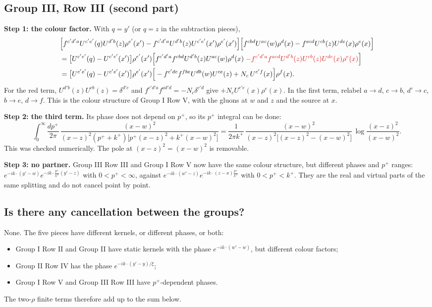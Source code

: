 \documentclass[9pt]{article}
\newcommand{\R}[1]{{\color{cR}#1}}
\numberwithin{equation}{section}
\begin{document}
\subsection{Group III, Row III (second part)}
\textbf{Step 1: the colour factor.} With $q=y'$ (or $q=z$ in the subtraction pieces),
\begin{align}
&\Big[f^{c'd'a}U^{c'e'}(q)U^{d'b}(z)\rho^{e'}(x')-f^{c'd'a}U^{d'b}(z)U^{c'e'}(x')\rho^{e'}(x')\Big]\Big[f^{cbd}U^{ac}(w)\rho^{d}(x)-f^{acd}U^{cb}(z)U^{de}(x)\rho^{e}(x)\Big]\notag\\
&=\big[U^{c'e'}(q)-U^{c'e'}(x')\big]\rho^{e'}(x')\Big[f^{c'd'a}f^{cbd}U^{d'b}(z)U^{ac}(w)\rho^{d}(x)\;\R{-f^{c'd'a}f^{acd}U^{d'b}(z)U^{cb}(z)U^{de}(x)\rho^{e}(x)}\Big]\notag\\
&=\big[U^{c'e'}(q)-U^{c'e'}(x')\big]\rho^{e'}(x')\Big[-f^{c'dc}f^{fbe}U^{db}(w)U^{ce}(z)+N_{c}\,U^{c'f}(x)\Big]\rho^{f}(x).
\end{align}
For the \R{red} term, $U^{d'b}(z)U^{cb}(z)=\delta^{d'c}$ and $f^{c'd'a}f^{ad'd}=-N_{c}\delta^{c'd}$ give $+N_{c}U^{c'e}(x)\rho^{e}(x)$. In the first term, relabel $a\to d$, $c\to b$, $d'\to c$, $b\to e$, $d\to f$. This is the colour structure of Group I Row V, with the gluons at $w$ and $z$ and the source at $x$.

\noindent\textbf{Step 2: the third term.} Its phase does not depend on $p^{+}$, so its $p^{+}$ integral can be done:
\begin{equation}
\int_{0}^{\infty}\frac{dp^{+}}{2\pi}\,\frac{(x-w)^{2}}{(x-z)^{2}(p^{+}+k^{+})\big[p^{+}(x-z)^{2}+k^{+}(x-w)^{2}\big]}=\frac{1}{2\pi k^{+}}\,\frac{(x-w)^{2}}{(x-z)^{2}\big[(x-z)^{2}-(x-w)^{2}\big]}\,\log\frac{(x-z)^{2}}{(x-w)^{2}}.
\end{equation}
This was checked numerically. The pole at $(x-z)^{2}=(x-w)^{2}$ is removable.

\noindent\textbf{Step 3: no partner.} Group III Row III and Group I Row V now have the same colour structure, but different phases and $p^{+}$ ranges: $e^{-ik\cdot(y'-w)}e^{-ik\cdot\frac{p^{+}}{k^{+}}(y'-z)}$ with $0<p^{+}<\infty$, against $e^{-ik\cdot(w'-z)}e^{-ik\cdot(z-x)\frac{p^{+}}{k^{+}}}$ with $0<p^{+}<k^{+}$. They are the real and virtual parts of the same splitting and do not cancel point by point.

\subsection{Is there any cancellation between the groups?}
None. The five pieces have different kernels, or different phases, or both:
\begin{itemize}
\item Group I Row II and Group II have static kernels with the phase $e^{-ik\cdot(w'-w)}$, but different colour factors;
\item Group II Row IV has the phase $e^{-ik\cdot(y'-y)/\xi}$;
\item Group I Row V and Group III Row III have $p^{+}$-dependent phases.
\end{itemize}
The two-$\rho$ finite terms therefore add up to the sum below.
\end{document}
